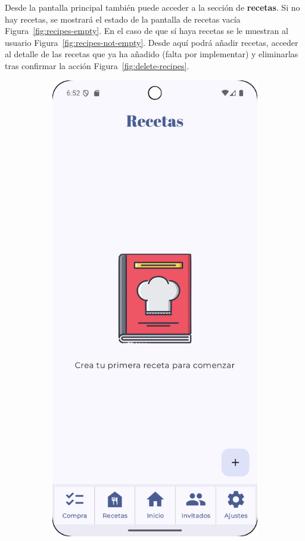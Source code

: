 \clearpage
Desde la pantalla principal también puede acceder a la sección de \textbf{recetas}. Si no hay recetas, se mostrará el estado de la pantalla de recetas vacía Figura~\ref{fig:recipes-empty}. En el caso de que sí haya recetas se le muestran al usuario Figura~\ref{fig:recipes-not-empty}. Desde aquí podrá añadir recetas, acceder al detalle de las recetas que ya ha añadido (falta por implementar) y eliminarlas tras confirmar la acción Figura~\ref{fig:delete-recipes}.

\begin{figure}[H]
    \centering

    \begin{subfigure}[b]{0.3\textwidth}
      \includegraphics[width=\textwidth]{./img/manual/recipes_list_empty.png}

\end{subfigure}
\end{figure}
